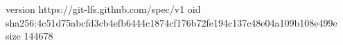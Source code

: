 version https://git-lfs.github.com/spec/v1
oid sha256:4c51d75abcfd3cb4efb6444c1874cf176b72fe194c137c48e04a109b108e499e
size 144678
